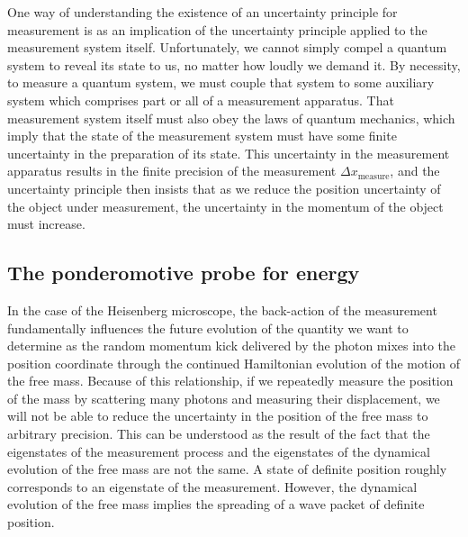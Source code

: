 One way of understanding the existence of an uncertainty principle for measurement is as an implication of the uncertainty principle applied to the measurement system itself.  Unfortunately, we cannot simply compel a quantum system to reveal its state to us, no matter how loudly we demand it.  By necessity, to measure a quantum system, we must couple that system to some auxiliary system which comprises part or all of a measurement apparatus.  That measurement system itself must also obey the laws of quantum mechanics, which imply that the state of the measurement system must have some finite uncertainty in the preparation of its state.  This uncertainty in the measurement apparatus results in the finite precision of the measurement $\Delta x_{\textrm{measure}}$, and the uncertainty principle then insists that as we reduce the position uncertainty of the object under measurement, the uncertainty in the momentum of the object must increase.

\subsection{The ponderomotive probe for energy}
\label{sec:ponder}

In the case of the Heisenberg microscope, the back-action of the measurement fundamentally influences the future evolution of the quantity we want to determine as the random momentum kick delivered by the photon mixes into the position coordinate through the continued Hamiltonian evolution of the motion of the free mass.  Because of this relationship, if we repeatedly measure the position of the mass by scattering many photons and measuring their displacement, we will not be able to reduce the uncertainty in the position of the free mass to arbitrary precision.  This can be understood as the result of the fact that the eigenstates of the measurement process and the eigenstates of the dynamical evolution of the free mass are not the same.  A state of definite position roughly corresponds to an eigenstate of the measurement.  However, the dynamical evolution of the free mass implies the spreading of a wave packet of definite position.

